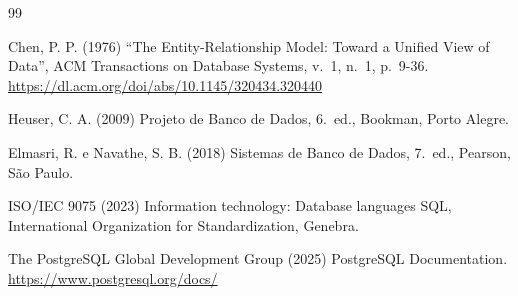 \renewcommand{\refname}{Referências}
\begin{thebibliography}{99}

 Chen, P. P. (1976) ``The Entity-Relationship Model: Toward a Unified View of Data'', ACM Transactions on Database Systems, v.~1, n.~1, p.~9-36. \url{https://dl.acm.org/doi/abs/10.1145/320434.320440}

 Heuser, C. A. (2009) Projeto de Banco de Dados, 6.~ed., Bookman, Porto Alegre.

 Elmasri, R. e Navathe, S. B. (2018) Sistemas de Banco de Dados, 7.~ed., Pearson, São Paulo.

 ISO/IEC 9075 (2023) Information technology: Database languages SQL, International Organization for Standardization, Genebra.

 The PostgreSQL Global Development Group (2025) PostgreSQL Documentation. \url{https://www.postgresql.org/docs/}

\end{thebibliography}

